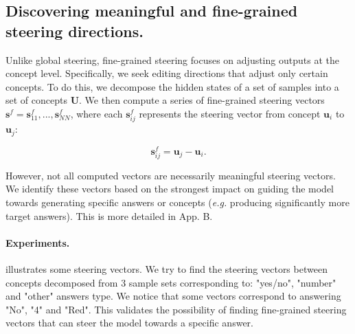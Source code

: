 \subsection{Discovering meaningful and fine-grained steering directions.}
\label{sec:model_steering_discovering}

Unlike global steering, fine-grained steering focuses on adjusting outputs at the concept level. Specifically, we seek editing directions that adjust only certain concepts. To do this, we decompose the hidden states of a set of samples into a set of concepts $\bm{U}$. We then compute a series of fine-grained steering vectors $\bm{s}^f = {\bm{s}_{11}^f, ..., \bm{s}_{NN}^f}$, where each $\bm{s}_{ij}^f$ represents the steering vector from concept $\bm{u}_i$ to $\bm{u}_j$:

\begin{equation} 
\label{eq:steering_vector_finegrained}
\bm{s}_{ij}^f = \bm{u}_j - \bm{u}_i.
\end{equation}



However, not all computed vectors are necessarily meaningful steering vectors. We identify these vectors based on the strongest impact on guiding the model towards generating specific answers or concepts (\emph{e.g.} producing significantly more target answers). This is more detailed in App. B.

\paragraph{Experiments.}  illustrates some steering vectors. We try to find the steering vectors between concepts decomposed from 3 sample sets corresponding to: "yes/no", "number" and "other" answers type. We notice that some vectors correspond to answering "No", "4" and "Red". This validates the possibility of finding fine-grained steering vectors that can steer the model towards a specific answer.



            




